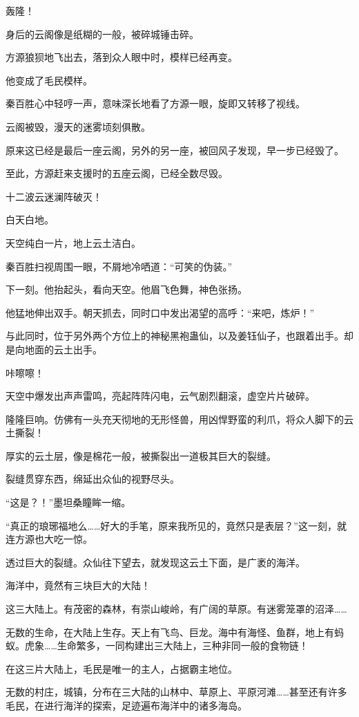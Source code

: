 \begin{this_body}
轰隆！

身后的云阁像是纸糊的一般，被碎城锤击碎。

方源狼狈地飞出去，落到众人眼中时，模样已经再变。

他变成了毛民模样。

秦百胜心中轻哼一声，意味深长地看了方源一眼，旋即又转移了视线。

云阁被毁，漫天的迷雾顷刻俱散。

原来这已经是最后一座云阁，另外的另一座，被回风子发现，早一步已经毁了。

至此，方源赶来支援时的五座云阁，已经全数尽毁。

十二波云迷澜阵破灭！

白天白地。

天空纯白一片，地上云土洁白。

秦百胜扫视周围一眼，不屑地冷哂道：“可笑的伪装。”

下一刻。他抬起头，看向天空。他眉飞色舞，神色张扬。

他猛地伸出双手。朝天抓去，同时口中发出渴望的高呼：“来吧，炼炉！”

与此同时，位于另外两个方位上的神秘黑袍蛊仙，以及姜钰仙子，也跟着出手。却是向地面的云土出手。

咔嚓嚓！

天空中爆发出声声雷鸣，亮起阵阵闪电，云气剧烈翻滚，虚空片片破碎。

隆隆巨响。仿佛有一头充天彻地的无形怪兽，用凶悍野蛮的利爪，将众人脚下的云土撕裂！

厚实的云土层，像是棉花一般，被撕裂出一道极其巨大的裂缝。

裂缝贯穿东西，绵延出众仙的视野尽头。

“这是？！”墨坦桑瞳眸一缩。

“真正的琅琊福地么……好大的手笔，原来我所见的，竟然只是表层？”这一刻，就连方源也大吃一惊。

透过巨大的裂缝。众仙往下望去，就发现这云土下面，是广袤的海洋。

海洋中，竟然有三块巨大的大陆！

这三大陆上。有茂密的森林，有崇山峻岭，有广阔的草原。有迷雾笼罩的沼泽……

无数的生命，在大陆上生存。天上有飞鸟、巨龙。海中有海怪、鱼群，地上有蚂蚁。虎象……生命繁多，一同构建出三大陆上，三种非同一般的食物链！

在这三片大陆上，毛民是唯一的主人，占据霸主地位。

无数的村庄，城镇，分布在三大陆的山林中、草原上、平原河滩……甚至还有许多毛民，在进行海洋的探索，足迹遍布海洋中的诸多海岛。


\end{this_body}
